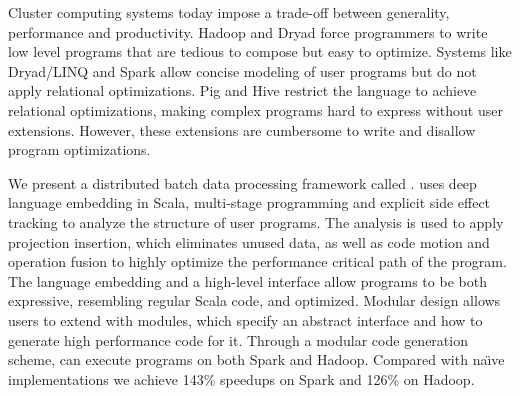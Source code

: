 Cluster computing systems today impose a trade-off between generality,
performance and productivity. Hadoop and Dryad force programmers to write low
level programs that are tedious to compose but easy to optimize. Systems like
Dryad/LINQ and Spark allow concise modeling of user programs but do not apply
relational optimizations. Pig and Hive restrict the language to achieve
relational optimizations, making complex programs hard to express without user
extensions. However, these extensions are cumbersome to write and disallow
program optimizations.

We present a distributed batch data processing framework called \tool.
\tool uses deep language embedding in Scala, multi-stage programming and explicit side effect
tracking to analyze the structure of user programs. The analysis is used to
apply projection insertion, which eliminates unused data, as well as code
motion and operation fusion to highly optimize the performance critical path of
the program. The language embedding and a high-level interface allow \tool
programs to be both expressive, resembling regular Scala code, and optimized.
Modular design allows users to extend \tool with modules, which specify an
abstract interface and how to generate high performance code for it. Through a
modular code generation scheme, \tool can execute programs on both Spark and
Hadoop. Compared with na\"{\i}ve implementations we achieve 143\% speedups on
Spark and 126\% on Hadoop.
